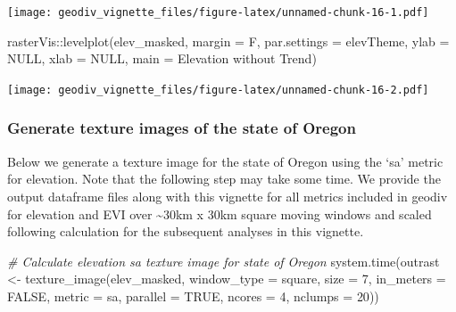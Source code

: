 \documentclass[
]{article}
\newenvironment{Shaded}{\begin{snugshade}}{\end{snugshade}}
\newcommand{\AttributeTok}[1]{\textcolor[rgb]{0.77,0.63,0.00}{#1}}
\newcommand{\CommentTok}[1]{\textcolor[rgb]{0.56,0.35,0.01}{\textit{#1}}}
\newcommand{\ConstantTok}[1]{\textcolor[rgb]{0.00,0.00,0.00}{#1}}
\newcommand{\DecValTok}[1]{\textcolor[rgb]{0.00,0.00,0.81}{#1}}
\newcommand{\FunctionTok}[1]{\textcolor[rgb]{0.00,0.00,0.00}{#1}}
\newcommand{\NormalTok}[1]{#1}
\newcommand{\OtherTok}[1]{\textcolor[rgb]{0.56,0.35,0.01}{#1}}
\newcommand{\SpecialCharTok}[1]{\textcolor[rgb]{0.00,0.00,0.00}{#1}}
\newcommand{\StringTok}[1]{\textcolor[rgb]{0.31,0.60,0.02}{#1}}
\begin{document}
\texttt{[image: geodiv\_vignette\_files/figure-latex/unnamed-chunk-16-1.pdf]}

\begin{Shaded}
\begin{Highlighting}[]
\NormalTok{rasterVis}\SpecialCharTok{::}\FunctionTok{levelplot}\NormalTok{(elev\_masked, }\AttributeTok{margin =}\NormalTok{ F, }\AttributeTok{par.settings =}\NormalTok{ elevTheme, }
                     \AttributeTok{ylab =} \ConstantTok{NULL}\NormalTok{, }\AttributeTok{xlab =} \ConstantTok{NULL}\NormalTok{, }\AttributeTok{main =} \StringTok{\textquotesingle{}Elevation without Trend\textquotesingle{}}\NormalTok{)}
\end{Highlighting}
\end{Shaded}

\texttt{[image: geodiv\_vignette\_files/figure-latex/unnamed-chunk-16-2.pdf]}

\hypertarget{generate-texture-images-of-the-state-of-oregon}{%
\subsubsection{Generate texture images of the state of
Oregon}\label{generate-texture-images-of-the-state-of-oregon}}

Below we generate a texture image for the state of Oregon using the `sa'
metric for elevation. Note that the following step may take some time.
We provide the output dataframe files along with this vignette for all
metrics included in geodiv for elevation and EVI over
\textasciitilde30km x 30km square moving windows and scaled following
calculation for the subsequent analyses in this vignette.

\begin{Shaded}
\begin{Highlighting}[]
\CommentTok{\# Calculate elevation sa texture image for state of Oregon}
\FunctionTok{system.time}\NormalTok{(outrast }\OtherTok{\textless{}{-}} \FunctionTok{texture\_image}\NormalTok{(elev\_masked, }\AttributeTok{window\_type =} \StringTok{\textquotesingle{}square\textquotesingle{}}\NormalTok{, }\AttributeTok{size =} \DecValTok{7}\NormalTok{, }
                         \AttributeTok{in\_meters =} \ConstantTok{FALSE}\NormalTok{, }\AttributeTok{metric =} \StringTok{\textquotesingle{}sa\textquotesingle{}}\NormalTok{, }\AttributeTok{parallel =} \ConstantTok{TRUE}\NormalTok{,}
                         \AttributeTok{ncores =} \DecValTok{4}\NormalTok{, }\AttributeTok{nclumps =} \DecValTok{20}\NormalTok{))}
\end{Highlighting}
\end{Shaded}
\end{document}
